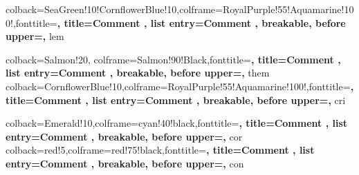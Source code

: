 {
    colback=SeaGreen!10!CornflowerBlue!10,colframe=RoyalPurple!55!Aquamarine!100!,fonttitle=\bfseries, title={Comment \thetcbcounter}, list entry={Comment \thetcbcounter\quad}, %
    breakable, %
    before upper={\parindent10pt\noindent},  %
}
{lem}


{
    colback=Salmon!20, colframe=Salmon!90!Black,fonttitle=\bfseries, title={Comment \thetcbcounter}, list entry={Comment \thetcbcounter\quad}, %
    breakable, %
    before upper={\parindent10pt\noindent},  %
}
{them}
{
    colback=CornflowerBlue!10,colframe=RoyalPurple!55!Aquamarine!100!,fonttitle=\bfseries, title={Comment \thetcbcounter}, list entry={Comment \thetcbcounter\quad}, %
    breakable, %
    before upper={\parindent10pt\noindent},  %
}
{cri}

{
    colback=Emerald!10,colframe=cyan!40!black,fonttitle=\bfseries, title={Comment \thetcbcounter}, list entry={Comment \thetcbcounter\quad}, %
    breakable, %
    before upper={\parindent10pt\noindent},  %
}
{cor}
{
    colback=red!5,colframe=red!75!black,fonttitle=\bfseries, title={Comment \thetcbcounter}, list entry={Comment \thetcbcounter\quad}, %
    breakable, %
    before upper={\parindent10pt\noindent},  %
}
{con}

